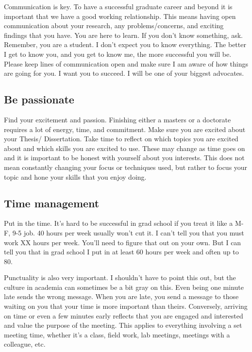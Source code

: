 \documentclass[
]{article}
\begin{document}
Communication is key. To have a successful graduate career and beyond it is important that we have a good working relationship. This means having open communication about your research, any problems/concerns, and exciting findings that you have. You are here to learn. If you don't know something, ask. Remember, you are a student. I don't expect you to know everything. The better I get to know you, and you get to know me, the more successful you will be. Please keep lines of communication open and make sure I am aware of how things are going for you. I want you to succeed. I will be one of your biggest advocates.

\hypertarget{be-passionate}{%
\subsection{Be passionate}\label{be-passionate}}

Find your excitement and passion. Finishing either a masters or a doctorate requires a lot of energy, time, and commitment. Make sure you are excited about your Thesis/ Dissertation. Take time to reflect on which topics you are excited about and which skills you are excited to use. These may change as time goes on and it is important to be honest with yourself about you interests. This does not mean constantly changing your focus or techniques used, but rather to focus your topic and hone your skills that you enjoy doing.

\hypertarget{time-management}{%
\subsection{Time management}\label{time-management}}

Put in the time. It's hard to be successful in grad school if you treat it like a M-F, 9-5 job. 40 hours per week usually won't cut it. I can't tell you that you must work XX hours per week. You'll need to figure that out on your own. But I can tell you that in grad school I put in at least 60 hours per week and often up to 80.

Punctuality is also very important. I shouldn't have to point this out, but the culture in academia can sometimes be a bit gray on this. Even being one minute late sends the wrong message. When you are late, you send a message to those waiting on you that your time is more important than theirs. Conversely, arriving on time or even a few minutes early reflects that you are engaged and interested and value the purpose of the meeting. This applies to everything involving a set meeting time, whether it's a class, field work, lab meetings, meetings with a colleague, etc.
\end{document}
